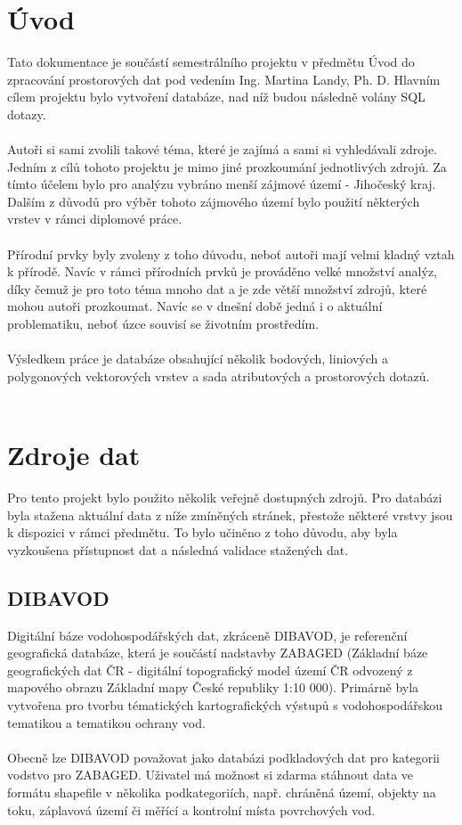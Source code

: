 \documentclass[a4paper, 12pt]{article}
\begin{document}
\section{Úvod}
Tato dokumentace je součástí semestrálního projektu v předmětu Úvod do zpracování prostorových dat pod vedením Ing. Martina Landy, Ph. D. Hlavním cílem projektu bylo vytvoření databáze, nad níž budou následně volány SQL dotazy.\\
\\
Autoři si sami zvolili takové téma, které je zajímá a sami si vyhledávali zdroje. Jedním z cílů tohoto projektu je mimo jiné prozkoumání jednotlivých zdrojů. Za tímto účelem bylo pro analýzu vybráno menší zájmové území - Jihočeský kraj. Dalším z důvodů pro výběr tohoto zájmového území bylo použití některých vrstev v rámci diplomové práce. \\
\\
Přírodní prvky byly zvoleny z toho důvodu, neboť autoři mají velmi kladný vztah k přírodě. Navíc v rámci přírodních prvků je prováděno velké množství analýz, díky čemuž je pro toto téma mnoho dat a je zde větší množství zdrojů, které mohou autoři prozkoumat. Navíc se v dnešní době jedná i o aktuální problematiku, neboť úzce souvisí se životním prostředím.\\
\\
Výsledkem práce je databáze obsahující několik bodových, liniových a polygonových vektorových vrstev a sada atributových a prostorových dotazů. \\
\\


\clearpage
\section{Zdroje dat}
Pro tento projekt bylo použito několik veřejně dostupných zdrojů. Pro databázi byla stažena aktuální data z níže zmíněných stránek, přestože některé vrstvy jsou k dispozici v rámci předmětu. To bylo učiněno z toho důvodu, aby byla vyzkoušena přístupnost dat a následná validace stažených dat. 

\subsection{DIBAVOD}
Digitální báze vodohospodářských dat, zkráceně DIBAVOD, je referenční geografická databáze, která je součástí nadstavby ZABAGED (Základní báze geografických dat ČR - digitální topografický model území ČR odvozený z mapového obrazu Základní mapy České republiky 1:10 000). Primárně byla vytvořena pro tvorbu tématických kartografických výstupů s vodohospodářskou tematikou a tematikou ochrany vod. \\
\\
Obecně lze DIBAVOD považovat jako databázi podkladových dat pro kategorii vodstvo pro ZABAGED. Uživatel má možnost si zdarma stáhnout data ve formátu shapefile v několika podkategoriích, např. chráněná území, objekty na toku, záplavová území či měřící a kontrolní místa povrchových vod. 
\end{document}
